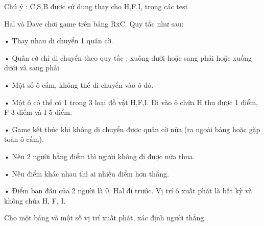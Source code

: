 Chú ý : C,S,B được sử dụng thay cho H,F,I, trong các test     

   Hal và Dave chơi game trên bảng RxC. Quy tắc như sau:  

   • Thay nhau di chuyển 1 quân cờ.  

   • Quân cờ chỉ di chuyển theo quy tắc : xuông dưới hoặc sang phải  hoặc xuống dưới và sang phải.  

   • Một số ô cấm, không thể di chuyển vào ô đó.  

   • Một ô có thể có 1 trong 3 loại đồ vật H,F,I. Đi vào ô chứa  H thu được 1 điểm, F-3 điểm và I-5 điểm.  

   • Game kết thúc khi không di chuyển được quân cờ nữa (ra ngoài  bảng hoặc gặp toàn ô cấm).  

   • Nếu 2 người bằng điểm thì người không đi được nữa thua.  

   • Nếu điểm khác nhau thì ai nhiều điểm hơn thắng.  

   • Điểm ban đầu của 2 người là 0. Hal đi trước. Vị trí ô xuất phát  là bất kỳ và không chứa H, F, I.  

   Cho một bảng và một số vị trí xuất phát, xác định người thắng.